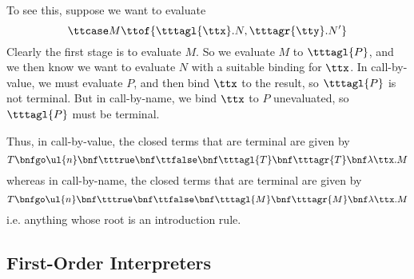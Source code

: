 \documentclass[runningheads,12pt]{llncs}
\begin{document}
To see this, suppose we want to evaluate 
\begin{displaymath}
\ttcase M \ttof \{ \tttagl{\ttx}.N, \tttagr{\tty}. N'\}
\end{displaymath}
Clearly the first stage is to evaluate $M$.   So we evaluate $M$ to $\tttagl{P}$, and we then know we want to evaluate $N$ with a suitable binding for $\ttx$.  In call-by-value, we must evaluate $P$, and then bind $\ttx$ to the result, so $\tttagl{P}$ is not terminal.  But in call-by-name, we bind $\ttx$ to $P$ unevaluated, so $\tttagl{P}$ must be terminal.

Thus, in call-by-value, the closed terms that are terminal are given by
\begin{displaymath}
  T \bnfgo \ul{n} \bnf \tttrue \bnf \ttfalse \bnf \tttagl{T} \bnf \tttagr{T} \bnf \lambda \ttx. M 
\end{displaymath}
whereas in call-by-name, the closed terms that are terminal are given by
\begin{displaymath}
  T \bnfgo \ul{n} \bnf \tttrue \bnf \ttfalse \bnf \tttagl{M} \bnf \tttagr{M} \bnf \lambda \ttx. M
\end{displaymath}
i.e. anything whose root is an introduction rule.  

\subsection{First-Order Interpreters}
\end{document}
